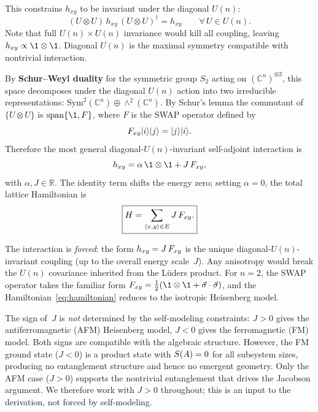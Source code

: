 This constrains $h_{xy}$ to be invariant under the diagonal $U(n)$:
\begin{equation}
  (U \otimes U)\, h_{xy}\, (U \otimes U)^\dagger = h_{xy}
  \qquad \forall\, U \in U(n).
  \label{eq:diagonal-invariance}
\end{equation}
Note that full $U(n) \times U(n)$ invariance would kill all coupling,
leaving $h_{xy} \propto \1 \otimes \1$.  Diagonal $U(n)$ is the maximal
symmetry compatible with nontrivial interaction.

By \textbf{Schur--Weyl duality} for the symmetric group $S_2$ acting
on $(\mathbb{C}^n)^{\otimes 2}$, this space decomposes under the
diagonal $U(n)$ action into two irreducible representations:
$\mathrm{Sym}^2(\mathbb{C}^n) \oplus \wedge^2(\mathbb{C}^n)$.  By
Schur's lemma the commutant of $\{U \otimes U\}$ is
$\mathrm{span}\{\1, F\}$, where $F$ is the SWAP operator defined by
\begin{equation}
  F_{xy} | i \rangle| j \rangle = | j \rangle| i \rangle.
  \label{eq:swap-def}
\end{equation}
Therefore the most general diagonal-$U(n)$-invariant self-adjoint
interaction is
\begin{equation}
  h_{xy} = \alpha\, \1 \otimes \1 + J\, \swapop,
  \label{eq:h-general}
\end{equation}
with $\alpha, J \in \mathbb{R}$.  The identity term shifts the energy
zero; setting $\alpha = 0$, the total lattice Hamiltonian is
\begin{equation}
  \boxed{H = \sum_{\langle x,y \rangle \in E} J\, F_{xy}.}
  \label{eq:hamiltonian}
\end{equation}

The interaction is \emph{forced}: the form $h_{xy} = J\,F_{xy}$ is
the unique diagonal-$U(n)$-invariant coupling (up to the overall
energy scale~$J$).  Any anisotropy would break the $U(n)$ covariance
inherited from the L\"uders product.  For $n = 2$, the SWAP operator
takes the familiar form
$\swapop = \frac{1}{2}(\1 \otimes \1 + \vec{\sigma} \cdot \vec{\sigma})$,
and the Hamiltonian~\eqref{eq:hamiltonian} reduces to the isotropic
Heisenberg model.

The sign of~$J$ is \emph{not} determined by the self-modeling
constraints: $J > 0$ gives the antiferromagnetic (AFM) Heisenberg
model, $J < 0$ gives the ferromagnetic (FM) model.  Both signs are
compatible with the algebraic structure.  However, the FM ground state
($J < 0$) is a product state with $S(A) = 0$ for all subsystem
sizes, producing no entanglement structure and hence no emergent
geometry.  Only the AFM case ($J > 0$) supports the nontrivial
entanglement that drives the Jacobson argument.  We therefore work
with $J > 0$ throughout; this is an input to the derivation, not
forced by self-modeling.

